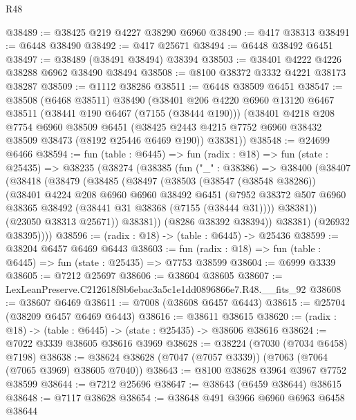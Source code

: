 \begin{lexlean}{R48}
\begin{coremodule}
@38489 := @38425 @219 @4227 @38290 @6960
@38490 := @417 @38313
@38491 := @6448 @38490
@38492 := @417 @25671
@38494 := @6448 @38492 @6451
@38497 := @38489 (@38491 @38494) @38394
@38503 := @38401 @4222 @4226 @38288 @6962 @38490 @38494
@38508 := @8100 @38372 @3332 @4221 @38173 @38287
@38509 := @1112 @38286
@38511 := @6448 @38509 @6451
@38547 := @38508
    (@6468 @38511)
    @38490
    (@38401
      @206
      @4220
      @6960
      @13120
      @6467
      @38511
      (@38441 @190 @6467 (@7155 (@38444 @190)))
      (@38401
        @4218
        @208
        @7754
        @6960
        @38509
        @6451
        (@38425 @2443 @4215 @7752 @6960 @38432 @38509 @38473 (@8192 @25446 @6469 @190))
        @38381))
@38548 := @24699 @6466
@38594 := fun (table : @6445) =>
  fun (radix : @18) =>
  fun (state : @25435) =>
  @38235
    (@38274
      (@38385
        (fun ("_" : @38386) =>
        @38400
          (@38407
            (@38418
              (@38479
                (@38485
                  (@38497
                    (@38503
                      (@38547 (@38548 @38286))
                      (@38401
                        @4224
                        @208
                        @6960
                        @6960
                        @38492
                        @6451
                        (@7952
                          @38372
                          @507
                          @6960
                          @38365
                          @38492
                          (@38441 @31 @38368 (@7155 (@38444 @31))))
                        @38381))
                    (@23050 @38313 @25671))
                  @38381))
              (@8286 @38392 @38394))
            @38381)
          (@26932 @38395))))
@38596 := (radix : @18) -> (table : @6445) -> @25436
@38599 := @38204 @6457 @6469 @6443
@38603 := fun (radix : @18) => fun (table : @6445) => fun (state : @25435) => @7753 @38599
@38604 := @6999 @3339
@38605 := @7212 @25697
@38606 := @38604 @38605
@38607 := LexLeanPreserve.C212618f8b6ebac3a5c1e1dd0896866e7.R48.__fits_92
@38608 := @38607 @6469
@38611 := @7008 (@38608 @6457 @6443)
@38615 := @25704 (@38209 @6457 @6469 @6443)
@38616 := @38611 @38615
@38620 := (radix : @18) -> (table : @6445) -> (state : @25435) -> @38606 @38616
@38624 := @7022 @3339 @38605 @38616 @3969
@38628 := @38224 (@7030 (@7034 @6458) @7198)
@38638 := @38624 @38628 (@7047 (@7057 @3339)) (@7063 (@7064 (@7065 @3969) @38605 @7040))
@38643 := @8100 @38628 @3964 @3967 @7752 @38599
@38644 := @7212 @25696
@38647 := @38643 (@6459 @38644) @38615
@38648 := @7117 @38628
@38654 := @38648 @491 @3966 @6960 @6963 @6458 @38644

\end{coremodule}
\end{lexlean}
